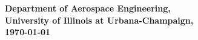 \begin{figure}[!ht]
\centering
{} 
\hspace{2cm}
\end{figure} 

\begin{center}
{{\bf \Large Department of Aerospace Engineering, \\
University of Illinois at Urbana-Champaign, \\ \vspace{0.2cm}
\today }}

\end{center}